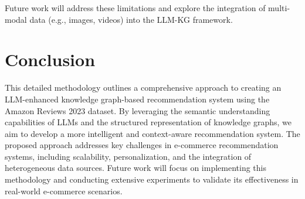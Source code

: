 \documentclass{article}
\begin{document}
Future work will address these limitations and explore the integration of multi-modal data (e.g., images, videos) into the LLM-KG framework.


\section{Conclusion}
This detailed methodology outlines a comprehensive approach to creating an LLM-enhanced knowledge graph-based recommendation system using the Amazon Reviews 2023 dataset. By leveraging the semantic understanding capabilities of LLMs and the structured representation of knowledge graphs, we aim to develop a more intelligent and context-aware recommendation system. The proposed approach addresses key challenges in e-commerce recommendation systems, including scalability, personalization, and the integration of heterogeneous data sources. Future work will focus on implementing this methodology and conducting extensive experiments to validate its effectiveness in real-world e-commerce scenarios.
\end{document}
